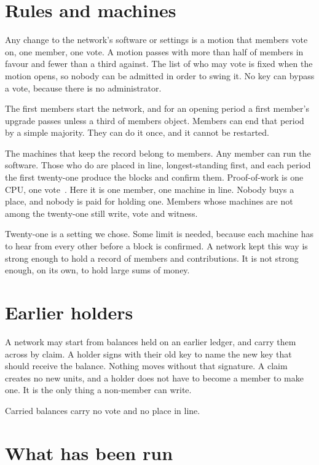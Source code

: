 \documentclass[11pt,a4paper]{article}
\begin{document}
\section{Rules and machines}
\label{sec:rules}

Any change to the network's software or settings is a motion that members vote on, one member, one vote. A motion passes with more than half of members in favour and fewer than a third against. The list of who may vote is fixed when the motion opens, so nobody can be admitted in order to swing it. No key can bypass a vote, because there is no administrator.

The first members start the network, and for an opening period a first member's upgrade passes unless a third of members object. Members can end that period by a simple majority. They can do it once, and it cannot be restarted.

The machines that keep the record belong to members. Any member can run the software. Those who do are placed in line, longest-standing first, and each period the first twenty-one produce the blocks and confirm them. Proof-of-work is one CPU, one vote~\cite{nakamoto2008}. Here it is one member, one machine in line. Nobody buys a place, and nobody is paid for holding one. Members whose machines are not among the twenty-one still write, vote and witness.

Twenty-one is a setting we chose. Some limit is needed, because each machine has to hear from every other before a block is confirmed. A network kept this way is strong enough to hold a record of members and contributions. It is not strong enough, on its own, to hold large sums of money.

\section{Earlier holders}
\label{sec:earlier}

A network may start from balances held on an earlier ledger, and carry them across by claim. A holder signs with their old key to name the new key that should receive the balance. Nothing moves without that signature. A claim creates no new units, and a holder does not have to become a member to make one. It is the only thing a non-member can write.

Carried balances carry no vote and no place in line.

\section{What has been run}
\label{sec:run}
\end{document}
